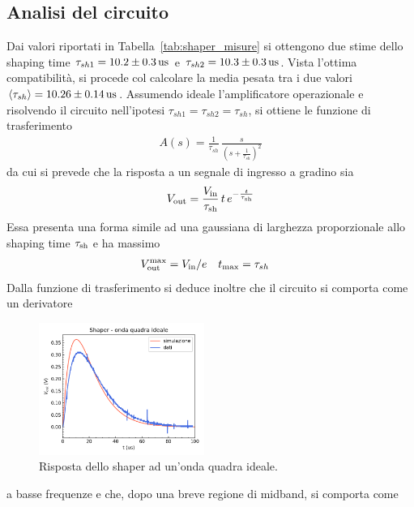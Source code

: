 
\subsection{Analisi del circuito}\label{sec:shaper_analisi}
Dai valori riportati in Tabella~\ref{tab:shaper_misure} si ottengono due
stime dello shaping time $\tau_{sh1}=10.2\pm 0.3 \us$ e
$\tau_{sh2}=10.3\pm 0.3 \us$.
Vista l'ottima compatibilità, si procede col calcolare la media pesata  tra i due valori $\langle \tau_{sh}\rangle = 10.26\pm 0.14 \us$.
Assumendo ideale l'amplificatore operazionale e risolvendo il circuito
nell'ipotesi $\tau_{sh1}=\tau_{sh2}=\tau_{sh}$, si ottiene le funzione di trasferimento
\begin{align}
  A(s)=\frac{1}{\tau_{sh}}\,\frac{s}{{(s+\frac{1}{\tau_{sh}})}^{2}}
\end{align}
da cui si prevede che la risposta a un segnale di ingresso a gradino sia
\begin{align}
  V_{\text{out}}=\frac{V_{\text{in}}}{\tau_{\text{sh}}}\, t\, e^{-\frac{t}{\tau_{\text{sh}}}}
\end{align}
Essa presenta una forma simile ad una gaussiana di larghezza proporzionale allo shaping time
$\tau_{\text{sh}}$ e ha massimo
\begin{align}
  V_{\text{out}}^{\text{max}}& =V_{\text{in}}/e
  &
    t_{\text{max}}&= \tau_{sh}
\end{align}
Dalla funzione di trasferimento si deduce inoltre che il circuito si comporta
come un derivatore
\begin{figure}
  \centering
  \includegraphics[width=0.48\textwidth]{../shaper/images/grafico_esp}
  \caption{\footnotesize{Risposta dello shaper ad un'onda quadra ideale.}}
\label{fig:shaper_id}%
\end{figure}
\noindent a basse frequenze e che, dopo una breve regione di midband, si comporta come
